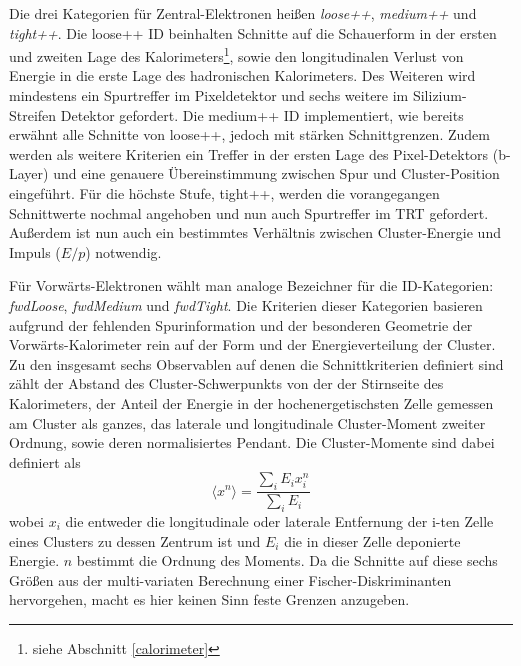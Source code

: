 Die drei Kategorien für Zentral-Elektronen heißen \textit{loose++},
\textit{medium++} und \textit{tight++}. Die loose++ ID beinhalten Schnitte auf
die Schauerform in der ersten und zweiten Lage des Kalorimeters\footnote{siehe
Abschnitt \ref{calorimeter}}, sowie den longitudinalen Verlust von Energie in
die erste Lage des hadronischen Kalorimeters. Des Weiteren wird mindestens ein
Spurtreffer im Pixeldetektor und sechs weitere im Silizium-Streifen Detektor
gefordert. Die medium++ ID implementiert, wie bereits erwähnt alle Schnitte von
loose++, jedoch mit stärken Schnittgrenzen. Zudem werden als weitere Kriterien
ein Treffer in der ersten Lage des Pixel-Detektors (b-Layer) und eine genauere
Übereinstimmung zwischen Spur und Cluster-Position eingeführt. Für die höchste
Stufe, tight++, werden die vorangegangen Schnittwerte nochmal angehoben und nun
auch Spurtreffer im \ac{TRT} gefordert. Außerdem ist nun auch ein bestimmtes
Verhältnis zwischen Cluster-Energie und Impuls ($E/p$) notwendig.

Für Vorwärts-Elektronen wählt man analoge Bezeichner für die ID-Kategorien:
\linebreak
\textit{fwdLoose}, \textit{fwdMedium} und \textit{fwdTight}. Die Kriterien
dieser Kategorien basieren aufgrund der fehlenden Spurinformation und der
besonderen Geometrie der Vorwärts-Kalorimeter rein auf der Form und der
Energieverteilung der Cluster. Zu den insgesamt sechs Observablen auf denen
die Schnittkriterien definiert sind zählt der Abstand des Cluster-Schwerpunkts
von der der Stirnseite des Kalorimeters, der Anteil der Energie in der
hochenergetischsten Zelle gemessen am Cluster als ganzes, das laterale und
longitudinale Cluster-Moment zweiter Ordnung, sowie deren normalisiertes
Pendant. Die Cluster-Momente sind dabei definiert als
\begin{equation}
    \langle x^n \rangle = \frac{\sum_i E_i x_i^n}{\sum_i E_i}
\end{equation}
wobei $x_i$ die entweder die longitudinale oder laterale Entfernung der i-ten
Zelle eines Clusters zu dessen Zentrum ist und $E_i$ die in dieser Zelle
deponierte Energie. $n$ bestimmt die Ordnung des Moments. Da die Schnitte auf
diese sechs Größen aus der multi-variaten Berechnung einer
Fischer-Diskriminanten hervorgehen, macht es hier keinen Sinn feste Grenzen
anzugeben.

